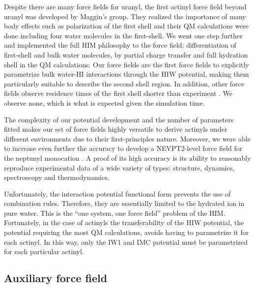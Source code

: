 Despite there are many force fields for 
uranyl\cite{JMolStr_Wipff_1996,JPhysChem_Wipff_1993,JPhysChemA_Kerisit_2013,JACS_Roos_2005,
PhysChemChemPhys_Pomogaev_2013,Duvail2019}, the first actinyl force field beyond uranyl was 
developed by 
Maggin's group\cite{PhysChemChemPhys_Pomogaev_2013,PhysChemChemPhys_Tiwari_2014}. 
They realized the importance of many body effects such as polarization of the first shell and their 
QM calculations were done including four water molecules in the first-shell. We went one step 
further and implemented the full HIM philosophy to the force field: differentiation of first-shell 
and bulk water molecules, by partial charge transfer and full hydration shell in the QM 
calculations. 
Our force fields are the first force fields to explicitly parametrize bulk water-HI interactions 
through the HIW potential, making them particularly suitable to describe the second shell region. 
In addition, other force fields observe residence 
times of the first shell shorter than 
experiment\cite{PhysChemChemPhys_Tiwari_2014,ChemRev_Helm_2005,chem_aq_ions_Richens,thesisAPanasci}
. We observe none, which is what is expected given the simulation time. 

The complexity of our potential development and the number of parameters fitted makes our set of 
force fields highly versatile to derive actinyls under different environments due to their 
first-principles nature. Moreover, we were able to increase even 
further the accuracy to develop a NEVPT2-level force field for the neptunyl monocation . A 
proof of its high 
accuracy is its ability to reasonably reproduce experimental data of a wide variety of types: 
structure, dynamics, spectroscopy and thermodynamics. 

Unfortunately, the interaction potential functional form prevents the use of combination rules. 
Therefore, they are essentially limited to the hydrated ion in pure water. This is the ``one 
system, one force field'' problem of the HIM. Fortunately, in the case of actinyls the 
transferability of the HIW potential, the potential requiring the most QM calculations, avoids 
having to parametrize it for each actinyl. In this way, only the IW1 and IMC potential must be 
parametrized for each particular actinyl.

\subsection[Auxiliary \ce{Am^{3+}} force field]{Auxiliary  force field}

